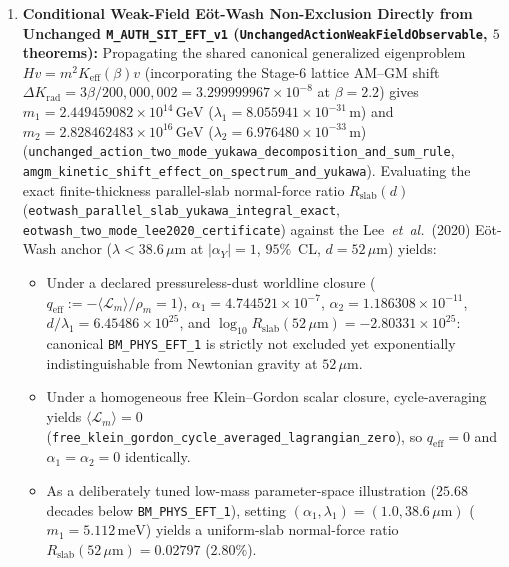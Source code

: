\begin{enumerate}[leftmargin=2em]
  \item \textbf{Conditional Weak-Field E\"ot-Wash Non-Exclusion Directly from Unchanged \texttt{M\_AUTH\_SIT\_EFT\_v1} (\texttt{UnchangedActionWeakFieldObservable}, $5$ theorems):} Propagating the shared canonical generalized eigenproblem $H v = m^2 K_{\mathrm{eff}}(\beta) v$ (incorporating the Stage-6 lattice AM--GM shift $\Delta K_{\mathrm{rad}} = 3\beta/200{,}000{,}002 = 3.299999967\times 10^{-8}$ at $\beta = 2.2$) gives $m_1 = 2.449459082\times 10^{14}\,\mathrm{GeV}$ ($\lambda_1 = 8.055941\times 10^{-31}\,\mathrm{m}$) and $m_2 = 2.828462483\times 10^{16}\,\mathrm{GeV}$ ($\lambda_2 = 6.976480\times 10^{-33}\,\mathrm{m}$) (\texttt{unchanged\_\allowbreak{}action\_\allowbreak{}two\_\allowbreak{}mode\_\allowbreak{}yukawa\_\allowbreak{}decomposition\_\allowbreak{}and\_\allowbreak{}sum\_\allowbreak{}rule}, \texttt{amgm\_\allowbreak{}kinetic\_\allowbreak{}shift\_\allowbreak{}effect\_\allowbreak{}on\_\allowbreak{}spectrum\_\allowbreak{}and\_\allowbreak{}yukawa}). Evaluating the exact finite-thickness parallel-slab normal-force ratio $R_{\mathrm{slab}}(d)$ (\texttt{eotwash\_\allowbreak{}parallel\_\allowbreak{}slab\_\allowbreak{}yukawa\_\allowbreak{}integral\_\allowbreak{}exact}, \texttt{eotwash\_\allowbreak{}two\_\allowbreak{}mode\_\allowbreak{}lee2020\_\allowbreak{}certificate}) against the Lee~\emph{et~al.}\ (2020) E\"ot-Wash anchor ($\lambda < 38.6\,\mu\mathrm{m}$ at $|\alpha_Y| = 1$, $95\%$~CL, $d = 52\,\mu\mathrm{m}$) yields:
  \begin{itemize}
    \item Under a declared pressureless-dust worldline closure ($q_{\mathrm{eff}} := -\langle\mathcal{L}_m\rangle/\rho_m = 1$), $\alpha_1 = 4.744521\times 10^{-7}$, $\alpha_2 = 1.186308\times 10^{-11}$, $d/\lambda_1 = 6.45486\times 10^{25}$, and $\log_{10} R_{\mathrm{slab}}(52\,\mu\mathrm{m}) = -2.80331\times 10^{25}$: canonical \texttt{BM\_PHYS\_EFT\_1} is strictly not excluded yet exponentially indistinguishable from Newtonian gravity at $52\,\mu\mathrm{m}$.
    \item Under a homogeneous free Klein--Gordon scalar closure, cycle-averaging yields $\langle\mathcal{L}_m\rangle = 0$ (\texttt{free\_\allowbreak{}klein\_\allowbreak{}gordon\_\allowbreak{}cycle\_\allowbreak{}averaged\_\allowbreak{}lagrangian\_\allowbreak{}zero}), so $q_{\mathrm{eff}} = 0$ and $\alpha_1 = \alpha_2 = 0$ identically.
    \item As a deliberately tuned low-mass parameter-space illustration ($25.68$ decades below \texttt{BM\_PHYS\_EFT\_1}), setting $(\alpha_1, \lambda_1) = (1.0, 38.6\,\mu\mathrm{m})$ ($m_1 = 5.112\,\mathrm{meV}$) yields a uniform-slab normal-force ratio $R_{\mathrm{slab}}(52\,\mu\mathrm{m}) = 0.02797$ ($2.80\%$).

\end{itemize}
\end{enumerate}
